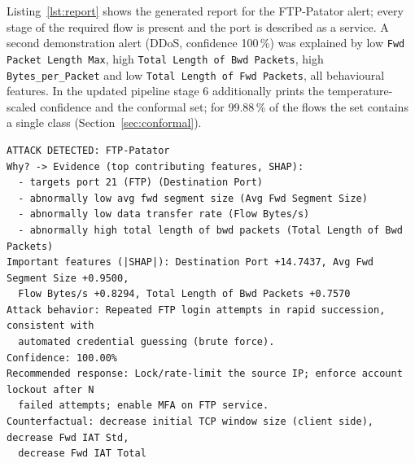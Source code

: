 \documentclass[11pt,a4paper]{article}
\newcommand{\feat}[1]{\texttt{#1}}
\begin{document}
\begin{table}[tbp]
\centering
\caption{Greedy versus constrained counterfactual search on the audited flows.}
\label{tab:cf}
\small
{}
\end{table}

Listing~\ref{lst:report} shows the generated report for the FTP-Patator alert; every stage of the required flow is present and the port is described as a service. A second demonstration alert (DDoS, confidence 100\,\%) was explained by low \feat{Fwd Packet Length Max}, high \feat{Total Length of Bwd Packets}, high \feat{Bytes_per_Packet} and low \feat{Total Length of Fwd Packets}, all behavioural features. In the updated pipeline stage 6 additionally prints the temperature-scaled confidence and the conformal set; for 99.88\,\% of the flows the set contains a single class (Section~\ref{sec:conformal}).

\begin{lstlisting}[float=tbp,caption={Generated XThreat report for the FTP-Patator alert.},label={lst:report}]
ATTACK DETECTED: FTP-Patator
Why? -> Evidence (top contributing features, SHAP):
  - targets port 21 (FTP) (Destination Port)
  - abnormally low avg fwd segment size (Avg Fwd Segment Size)
  - abnormally low data transfer rate (Flow Bytes/s)
  - abnormally high total length of bwd packets (Total Length of Bwd Packets)
Important features (|SHAP|): Destination Port +14.7437, Avg Fwd Segment Size +0.9500,
  Flow Bytes/s +0.8294, Total Length of Bwd Packets +0.7570
Attack behavior: Repeated FTP login attempts in rapid succession, consistent with
  automated credential guessing (brute force).
Confidence: 100.00%
Recommended response: Lock/rate-limit the source IP; enforce account lockout after N
  failed attempts; enable MFA on FTP service.
Counterfactual: decrease initial TCP window size (client side), decrease Fwd IAT Std,
  decrease Fwd IAT Total
\end{lstlisting}
\end{document}
